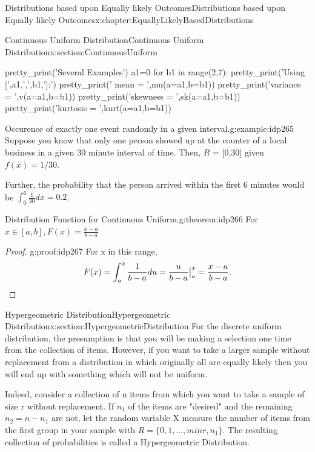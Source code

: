 \documentclass[oneside,10pt,]{book}
\newcommand{\qedhere}{\relax}
\numberwithin{equation}{section}
\begin{document}
\begin{chapterptx}{Distributions based upon Equally likely Outcomes}{}{Distributions based upon Equally likely Outcomes}{}{}{x:chapter:EquallyLikelyBasedDistributions}
\begin{sectionptx}{Continuous Uniform Distribution}{}{Continuous Uniform Distribution}{}{}{x:section:ContinuousUniform}
\begin{sageinput}
pretty_print('Several Examples')
a1=0
for b1 in range(2,7):
    pretty_print('Using [',a1,',',b1,']:')
    pretty_print('    mean = ',mu(a=a1,b=b1))
    pretty_print('variance = ',v(a=a1,b=b1))
    pretty_print('skewness = ',sk(a=a1,b=b1))
    pretty_print('kurtosis = ',kurt(a=a1,b=b1))
\end{sageinput}
%
\par
\begin{example}{Occurence of exactly one event randomly in a given interval.}{g:example:idp265}%
Suppose you know that only one person showed up at the counter of a local business in a given 30 minute interval of time. Then, \(R\) = [0,30] given \(f(x) = 1/30\).%
\par
Further, the probability that the person arrived within the first 6 minutes would be \(\int_0^6 \frac{1}{30} dx = 0.2\).%
\end{example}
%
\par
\begin{theorem}{Distribution Function for Continuous Uniform.}{}{g:theorem:idp266}%
For \(x \in [a,b], F(x) = \frac{x-a}{b-a}\)%
\end{theorem}
\begin{proof}{}{g:proof:idp267}
For x in this range,%
\begin{equation*}
F(x) = \int_a^x \frac{1}{b-a} du = \frac{u}{b-a} \big |_a^x = \frac{x-a}{b-a}.\qedhere
\end{equation*}
%
\end{proof}
%
\end{sectionptx}
%
%
\typeout{************************************************}
\typeout{************************************************}
%
\begin{sectionptx}{Hypergeometric Distribution}{}{Hypergeometric Distribution}{}{}{x:section:HypergeometricDistribution}
For the discrete uniform distribution, the presumption is that you will be making a selection one time from the collection of items. However, if you want to take a larger sample without replacement from a distribution in which originally all are equally likely then you will end up with something which will not be uniform.%
\par
Indeed, consider a collection of n items from which you want to take a sample of size r without replacement. If \(n_1\) of the items are "desired" and the remaining \(n_2 = n - n_1\) are not, let the random variable X measure the number of items from the first group in your sample with \(R = \{0, 1, ..., min {r,n_1} \}\). The resulting collection of probabilities is called a Hypergeometric Distribution.%

\end{sectionptx}
\end{chapterptx}
\end{document}
